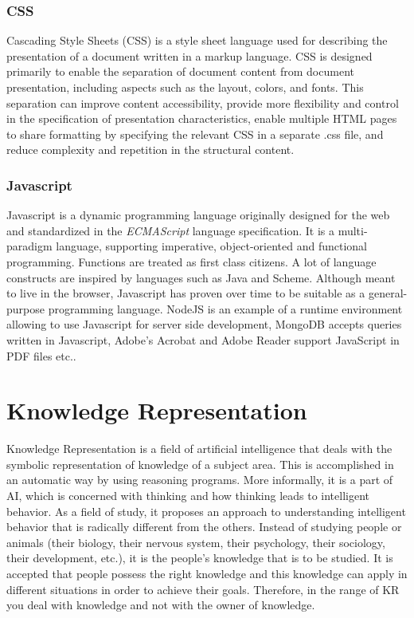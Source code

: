 \subsubsection{CSS}
Cascading Style Sheets (CSS) is a style sheet language used for describing the presentation of a document written in a markup language. CSS is designed primarily to enable the separation of document content from document presentation, including aspects such as the layout, colors, and fonts. This separation can improve content accessibility, provide more flexibility and control in the specification of presentation characteristics, enable multiple HTML pages to share formatting by specifying the relevant CSS in a separate .css file, and reduce complexity and repetition in the structural content.

\subsubsection{Javascript}

Javascript is a dynamic programming language originally designed for the web and standardized in the \textit{ECMAScript} language specification. It is a multi-paradigm language, supporting imperative, object-oriented and functional programming. Functions are treated as first class citizens. A lot of language constructs are inspired by languages such as Java and Scheme. Although meant to live in the browser, Javascript has proven over time to be suitable as a general-purpose programming language. NodeJS is an example of a runtime environment allowing to use Javascript for server side development, MongoDB accepts queries written in Javascript, Adobe's Acrobat and Adobe Reader support JavaScript in PDF files etc..

\section{Knowledge Representation}
Knowledge Representation is a field of artificial intelligence that deals with the symbolic representation of knowledge of a subject area. This is accomplished in an automatic way by using reasoning programs. More informally, it is a part of AI, which is concerned with thinking and how thinking leads to intelligent behavior. As a field of study, it proposes an approach to understanding intelligent behavior that is radically different from the others. Instead of studying people or animals (their biology, their nervous system, their psychology, their sociology, their development, etc.), it is the people's knowledge that is to be studied. It is accepted that people possess the right knowledge and this knowledge can apply in different situations in order to achieve their goals. Therefore, in the range of KR you deal with knowledge and not with the owner of knowledge.

